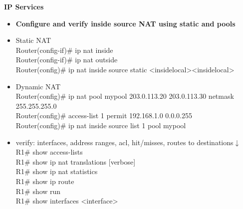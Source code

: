 \documentclass{article}
\begin{document}
\begin{flushleft}\textbf{IP Services}\end{flushleft}
\begin{itemize}
  \item \textbf{Configure and verify inside source NAT using static and pools}
  	\item[] Static NAT\\
		Router(config-if)\# ip nat inside\\
		Router(config-if)\# ip nat outside\\
		Router(config)\# ip nat inside source static \textless inside\-local\textgreater \textless inside\-local\textgreater
	\item[] Dynamic NAT\\
		Router(config)\# ip nat pool mypool 203.0.113.20 203.0.113.30 netmask 255.255.255.0\\
		Router(config)\# access-list 1 permit 192.168.1.0 0.0.0.255\\
		Router(config)\# ip nat inside source list 1 pool mypool\\
	\item[] verify: interfaces, address ranges, acl, hit/misses, routes to destinations$\downarrow$\\
		R1\# show access-lists\\
		R1\# show ip nat translations [verbose]\\
		R1\# show ip nat statistics\\
		R1\# show ip route\\
		R1\# show run\\
		R1\# show interfaces \textless interface\textgreater
		

\end{itemize}
\end{document}
